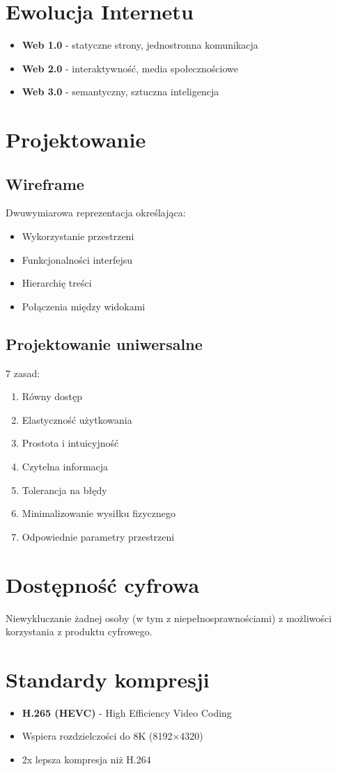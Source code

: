 \section{Ewolucja Internetu}
\begin{itemize}[noitemsep]
    \item \textbf{Web 1.0} - statyczne strony, jednostronna komunikacja
    \item \textbf{Web 2.0} - interaktywność, media społecznościowe
    \item \textbf{Web 3.0} - semantyczny, sztuczna inteligencja
\end{itemize}

\section{Projektowanie}
\subsection{Wireframe}
Dwuwymiarowa reprezentacja określająca:
\begin{itemize}[noitemsep]
    \item Wykorzystanie przestrzeni
    \item Funkcjonalności interfejsu
    \item Hierarchię treści
    \item Połączenia między widokami
\end{itemize}

\subsection{Projektowanie uniwersalne}
7 zasad:
\begin{enumerate}[noitemsep]
    \item Równy dostęp
    \item Elastyczność użytkowania
    \item Prostota i intuicyjność
    \item Czytelna informacja
    \item Tolerancja na błędy
    \item Minimalizowanie wysiłku fizycznego
    \item Odpowiednie parametry przestrzeni
\end{enumerate}

\section{Dostępność cyfrowa}
Niewykluczanie żadnej osoby (w tym z niepełnosprawnościami) z możliwości korzystania z produktu cyfrowego.

\section{Standardy kompresji}
\begin{itemize}[noitemsep]
    \item \textbf{H.265 (HEVC)} - High Efficiency Video Coding
    \item Wspiera rozdzielczości do 8K (8192×4320)
    \item 2x lepsza kompresja niż H.264
\end{itemize}

